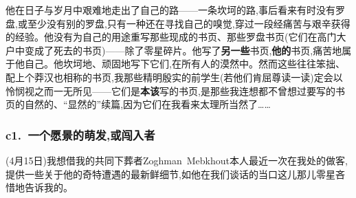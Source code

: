 \noindent 他在日子与岁月中艰难地走出了自己的路——一条坎坷的路,事后看来有时没有罗盘,或至少没有别的罗盘,只有一种还在寻找自己的嗅觉,穿过一段\dmark{}经痛苦与艰辛获得的经验。他没有为自己的用途重写那些现成的书页、那些罗盘书页(它们在高门大户中变成了死去的书页)——除了零星碎片。他写了\textbf{另一些}书页,\textbf{他的}书页,痛苦地属于他自己。他坎坷地、顽固地写下它们,在所有人的漠然中。然而这些往往笨拙、配上个莽汉也相称的书页,我那些精明殷实的前学生(若他们肯屈尊读一读)定会以怜悯视之而一无所见——它们是\textbf{本该}写的书页,是那些我连想都不曾想过要写的书页的自然的、“显然的”续篇,因为它们在我看来太理所当然了……

\subsubsection*{c1.~一个愿景的萌发,或闯入者}



\noindent (4月15日)我想借我的共同下葬者Zoghman~Mebkhout本人最近一次在我处的做客,提供一些关于他的奇特遭遇的最新鲜细节,如他在我们谈话的当口这儿那儿零星吝惜地告诉我的。

